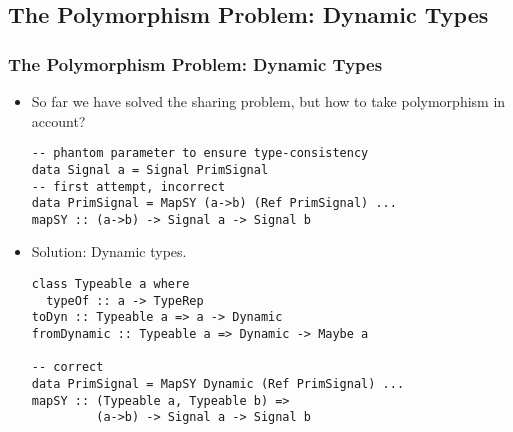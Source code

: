 \documentclass{beamer}
\begin{document}
\subsection{The Polymorphism Problem: Dynamic Types}
\begin{frame}[fragile]
  \frametitle{The Polymorphism Problem: Dynamic Types}
\vspace{-0.4cm}
  \begin{itemize}
  \item So far we have solved the sharing problem, but how to take
    polymorphism in account?
\begin{lstlisting}   
-- phantom parameter to ensure type-consistency
data Signal a = Signal PrimSignal 
-- first attempt, incorrect
data PrimSignal = MapSY (a->b) (Ref PrimSignal) ...
mapSY :: (a->b) -> Signal a -> Signal b
\end{lstlisting}
\pause
  \item Solution: Dynamic types.
      \begin{lstlisting}
class Typeable a where
  typeOf :: a -> TypeRep
toDyn :: Typeable a => a -> Dynamic
fromDynamic :: Typeable a => Dynamic -> Maybe a

-- correct
data PrimSignal = MapSY Dynamic (Ref PrimSignal) ...
mapSY :: (Typeable a, Typeable b) => 
         (a->b) -> Signal a -> Signal b
   \end{lstlisting} 
  \end{itemize}    
\end{frame}
\end{document}
